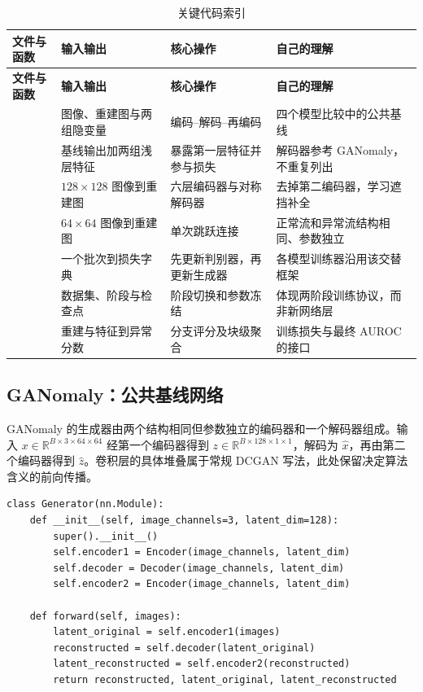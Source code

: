 \documentclass[UTF8,12pt]{ctexart}
\begin{document}
\begin{longtable}{L{4.0cm}L{2.4cm}L{3.0cm}L{3.8cm}}
\caption{关键代码索引}\\
\toprule
\textbf{文件与函数} & \textbf{输入输出} & \textbf{核心操作} & \textbf{自己的理解} \\
\midrule
\endfirsthead
\toprule
\textbf{文件与函数} & \textbf{输入输出} & \textbf{核心操作} & \textbf{自己的理解} \\
\midrule
\endhead
{} & 图像、重建图与两组隐变量 & 编码--解码--再编码 & 四个模型比较中的公共基线 \\
 & 基线输出加两组浅层特征 & 暴露第一层特征并参与损失 & 解码器参考 GANomaly，不重复列出 \\
 & $128\times128$ 图像到重建图 & 六层编码器与对称解码器 & 去掉第二编码器，学习遮挡补全 \\
 & $64\times64$ 图像到重建图 & 单次跳跃连接 & 正常流和异常流结构相同、参数独立 \\
 & 一个批次到损失字典 & 先更新判别器，再更新生成器 & 各模型训练器沿用该交替框架 \\
 & 数据集、阶段与检查点 & 阶段切换和参数冻结 & 体现两阶段训练协议，而非新网络层 \\
 & 重建与特征到异常分数 & 分支评分及块级聚合 & 训练损失与最终 AUROC 的接口 \\
\bottomrule
\end{longtable}

\subsection{GANomaly：公共基线网络}

GANomaly 的生成器由两个结构相同但参数独立的编码器和一个解码器组成。输入 $x\in\mathbb{R}^{B\times3\times64\times64}$ 经第一个编码器得到 $z\in\mathbb{R}^{B\times128\times1\times1}$，解码为 $\hat{x}$，再由第二个编码器得到 $\hat{z}$。卷积层的具体堆叠属于常规 DCGAN 写法，此处保留决定算法含义的前向传播。

\begin{lstlisting}[style=pythonstyle,caption={GANomaly 生成器的核心前向传播},label={lst:ganomaly-forward}]
class Generator(nn.Module):
    def __init__(self, image_channels=3, latent_dim=128):
        super().__init__()
        self.encoder1 = Encoder(image_channels, latent_dim)
        self.decoder = Decoder(image_channels, latent_dim)
        self.encoder2 = Encoder(image_channels, latent_dim)

    def forward(self, images):
        latent_original = self.encoder1(images)
        reconstructed = self.decoder(latent_original)
        latent_reconstructed = self.encoder2(reconstructed)
        return reconstructed, latent_original, latent_reconstructed
\end{lstlisting}
\end{document}
